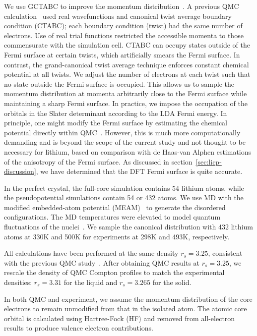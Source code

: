 \documentclass[aps,prb,showpacs,preprintnumbers,amsmath,amssymb,superscriptaddress,twocolumn]{revtex4-1}
\begin{document}
We use GCTABC to improve the momentum distribution~\cite{PhysRevLett.97.076404,Holzmann2009}. A previous QMC calculation~\cite{Filippi1999} used real wavefunctions and canonical twist average boundary condition (CTABC); each boundary condition (twist) had the same number of electrons. Use of real trial functions restricted the accessible momenta to those commensurate with the simulation cell. CTABC can occupy states outside of the Fermi surface at certain twists, which artificially smears the Fermi surface. In contrast, the grand-canonical twist average technique enforces constant chemical potential at all twists. We adjust the number of electrons at each twist such that no state outside the Fermi surface is occupied. This allows us to sample the momentum distribution at momenta arbitrarily close to the Fermi surface while maintaining a sharp Fermi surface. In practice, we impose the occupation of the orbitals in the Slater determinant according to the LDA Fermi energy. In principle, one might modify the Fermi surface by estimating the chemical potential directly within QMC~\cite{Yang2020}. However, this is much more computationally demanding and is beyond the scope of the current study and not thought to be necessary for lithium, based on comparison with de Haas-van Alphen estimations of the anisotropy of the Fermi surface. As discussed in section~\ref{sec:licp-discussion}, we have determined that the DFT Fermi surface is quite accurate.

In the perfect crystal, the full-core simulation contains 54 lithium atoms, while the pseudopotential simulations contain 54 or 432 atoms. We use MD with the modified embedded-atom potential (MEAM)~\cite{Baskes1992} to generate the disordered configurations.
The MD temperatures were elevated to model quantum fluctuations of the nuclei~\cite{Filippi1998}.
We sample the canonical distribution with 432 lithium atoms at 330K and 500K for experiments at 298K and 493K, respectively.

All calculations have been performed at the same density $r_s=3.25$, consistent with the previous QMC study~\cite{Filippi1999}. After obtaining QMC results at $r_s=3.25$, we rescale the density of QMC Compton profiles to match the experimental densities: $r_s=3.31$ for the liquid and $r_s=3.265$ for the solid.

In both QMC and experiment, we assume the momentum distribution of the core electrons to remain unmodified from that in the isolated atom. The atomic core orbital is calculated using Hartree-Fock (HF) and removed from all-electron results to produce valence electron contributions.
\end{document}
